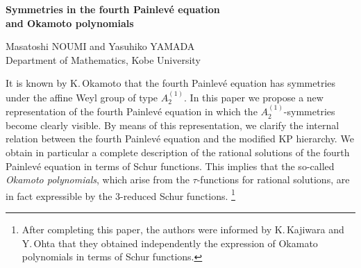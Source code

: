 \par\bigskip
\begin{center}
{\Large \bf
Symmetries in the fourth  Painlev\'e  equation \\ 
and Okamoto polynomials
}
\end{center}
\par\medskip
\begin{center}
Masatoshi NOUMI and Yasuhiko YAMADA \\
{\small
Department of Mathematics, Kobe University
}
\end{center}
\par\bigskip
\par\bigskip
It is known by K.\,Okamoto \cite{Ok} that the fourth Painlev\'e equation has
symmetries  under the affine Weyl group of type $A^{(1)}_2$.  
In this paper we propose a new representation of the fourth Painlev\'e 
equation in which the $A^{(1)}_2$-symmetries become clearly visible. 
By means of this representation, we clarify the internal relation between 
the fourth Painlev\'e equation  and the modified KP hierarchy.  
We obtain in particular a complete description of the rational 
solutions of the fourth  Painlev\'e equation in terms of Schur functions. 
This implies that the so-called {\em Okamoto polynomials}, 
which arise from the $\tau$-functions for rational solutions, 
are in fact expressible by the 3-reduced Schur functions.
\footnote{
After completing this paper, the authors were informed by 
K.\,Kajiwara and Y.\,Ohta that they obtained independently 
the expression of Okamato polynomials in terms of Schur functions. }
\par\medskip
